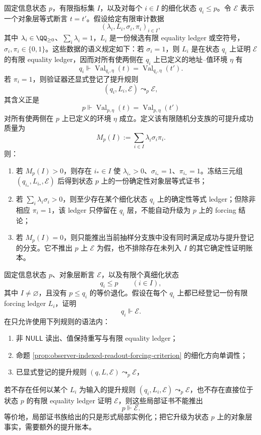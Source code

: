 \begin{proposition}[随机分支读出的确定性冻结与提升门控]\label{prop:distill-bourgain-forcing-random-certificate-extraction}
固定信息状态 \(p\)，有限指标集 \(I\)，以及对每个 \(i\in I\) 的细化状态 \(q_i\le p\)。令 \(\mathcal E\) 表示一个对象层等式断言 \(t=t'\)。假设给定有限审计数据
\[
(\lambda_i,L_i,\sigma_i,\pi_i)_{i\in I},
\]
其中 \(\lambda_i\in\QQ_{\ge0}\)、\(\sum_i\lambda_i=1\)，\(L_i\) 是一份候选有限 equality ledger 或空符号，\(\sigma_i,\pi_i\in\{0,1\}\)。这些数据的语义规定如下：若 \(\sigma_i=1\)，则 \(L_i\) 是在状态 \(q_i\) 上证明 \(\mathcal E\) 的有限 equality ledger，因而对所有使两侧在 \(q_i\) 上已定义的地址--值环境 \(\eta\) 有
\[
q_i\Vdash \operatorname{Val}_{q_i,\eta}(t)=\operatorname{Val}_{q_i,\eta}(t').
\]
若 \(\pi_i=1\)，则验证器还显式登记了提升规则
\[
(q_i,L_i,\mathcal E)\leadsto_p \mathcal E,
\]
其含义正是
\[
p\Vdash \operatorname{Val}_{p,\eta}(t)=\operatorname{Val}_{p,\eta}(t')
\]
对所有使两侧在 \(p\) 上已定义的环境 \(\eta\) 成立。定义该有限随机分支族的可提升成功质量为
\[
M_p(I):=\sum_{i\in I}\lambda_i\sigma_i\pi_i.
\]
则：
\begin{enumerate}
  \item 若 \(M_p(I)>0\)，则存在 \(i_\ast\in I\) 使 \(\lambda_{i_\ast}>0\)、\(\sigma_{i_\ast}=1\)、\(\pi_{i_\ast}=1\)。冻结三元组 \((q_{i_\ast},L_{i_\ast},\mathcal E)\) 后得到状态 \(p\) 上的一份确定性对象层等式证书；
  \item 若 \(\sum_i\lambda_i\sigma_i>0\)，则至少存在某个细化状态 \(q_i\) 上的确定性等式 ledger；但除非相应 \(π_i=1\)，该 ledger 只停留在 \(q_i\) 层，不能自动升级为 \(p\) 上的 forcing 结论；
  \item 若 \(M_p(I)=0\)，则只能推出当前抽样分支族中没有同时满足成功与提升登记的分支。它不推出 \(p\) 上 \(\mathcal E\) 为假，也不排除存在未列入 \(I\) 的其它确定性证明账本。
\end{enumerate}
\end{proposition}

\begin{proposition}[局部证书提升的反向单调性缺口]\label{prop:distill-gromov-forcing-local-certificate-promotion-gate}
固定信息状态 \(p\)、对象层断言 \(\mathcal E\)，以及有限个真细化状态
\[
q_i\le p\qquad(i\in I),
\]
其中 \(I\ne\varnothing\)，且没有 \(p\le q_i\) 的等价退化。假设在每个 \(q_i\) 上都已经登记一份有限 forcing ledger \(L_i\)，证明
\[
q_i\Vdash \mathcal E.
\]
在只允许使用下列规则的语法内：
\begin{enumerate}
  \item 非 \(\mathsf{NULL}\) 读出、值保持重写与有限 equality ledger；
  \item 命题 \ref{prop:observer-indexed-readout-forcing-criterion} 的细化方向单调性；
  \item 已显式登记的提升规则 \((q,L,\mathcal E)\leadsto_p\mathcal E\)，
\end{enumerate}
若不存在任何以某个 \(L_i\) 为输入的提升规则 \((q_i,L_i,\mathcal E)\leadsto_p\mathcal E\)，也不存在直接位于状态 \(p\) 的有限 equality ledger 证明 \(\mathcal E\)，则这些局部证书不能推出
\[
p\Vdash \mathcal E.
\]
等价地，局部证书族给出的只是形式局部实例化；把它升级为状态 \(p\) 上的对象层事实，需要额外的提升账本。
\end{proposition}

